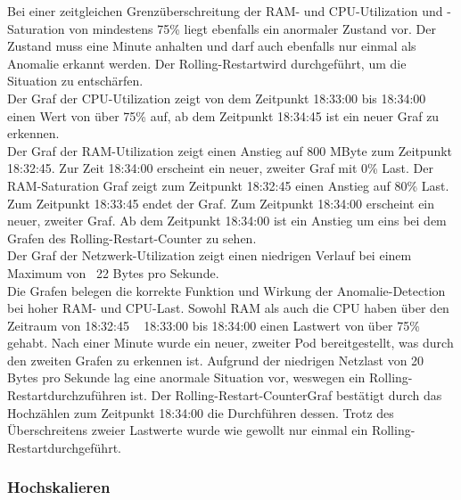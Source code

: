 \documentclass[a4paper,10pt]{scrartcl}
\begin{document}
\begin{description}
Bei einer zeitgleichen Grenzüberschreitung der RAM- und CPU-Utilization und -Saturation von mindestens 75\% liegt ebenfalls ein anormaler Zustand vor. Der Zustand muss eine Minute anhalten und darf auch ebenfalls nur einmal als\\ Anomalie erkannt werden. Der \glqq Rolling-Restart\grqq wird durchgeführt, um die Situation zu entschärfen.\\
Der Graf der CPU-Utilization zeigt von dem Zeitpunkt 18:33:00 bis 18:34:00 einen Wert von über 75\% auf, ab dem Zeitpunkt 18:34:45 ist ein neuer Graf zu erkennen.\\
Der Graf der RAM-Utilization zeigt einen Anstieg auf 800 MByte zum Zeitpunkt 18:32:45. Zur Zeit 18:34:00 erscheint ein neuer, zweiter Graf mit 0\% Last.
Der RAM-Saturation Graf zeigt zum Zeitpunkt 18:32:45 einen Anstieg auf 80\% Last. Zum Zeitpunkt 18:33:45 endet der Graf. Zum Zeitpunkt 18:34:00 erscheint ein neuer, zweiter Graf.
Ab dem Zeitpunkt 18:34:00 ist ein Anstieg um eins bei dem Grafen des \glqq Rolling-Restart\grqq -Counter zu sehen.\\
Der Graf der Netzwerk-Utilization zeigt einen niedrigen Verlauf bei einem Maximum von ~22 Bytes pro Sekunde.\\
Die Grafen belegen die korrekte Funktion und Wirkung der Anomalie-Detection bei hoher RAM- und CPU-Last. Sowohl RAM als auch die CPU haben über den Zeitraum von 18:32:45 ~ 18:33:00 bis 18:34:00 einen Lastwert von über 75\% gehabt. Nach einer Minute wurde ein neuer, zweiter Pod bereitgestellt, was durch den zweiten Grafen zu erkennen ist. Aufgrund der niedrigen Netzlast von 20 Bytes pro Sekunde lag eine anormale Situation vor, weswegen ein \glqq Rolling-Restart\grqq durchzuführen ist. Der \glqq Rolling-Restart-Counter\grqq Graf bestätigt durch das Hochzählen zum Zeitpunkt 18:34:00 die Durchführen dessen. Trotz des Überschreitens zweier Lastwerte wurde wie gewollt nur einmal ein \glqq Rolling-Restart\grqq durchgeführt.

\end{description}

\pagebreak

\subsubsection{Hochskalieren}
\end{document}
